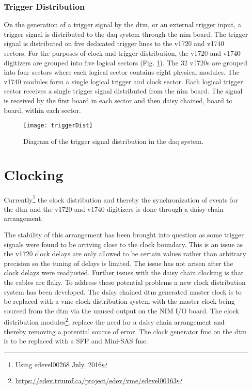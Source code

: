 \subsubsection{Trigger Distribution}
On the generation of a trigger signal by the \gls{dtm}, or an external trigger input, a trigger signal is distributed to the \gls{daq} system through the \gls{nim} board. 
The trigger signal is distributed on five dedicated trigger lines to the \gls{v1720} and \gls{v1740} sectors.
For the purposes of clock and trigger distribution, the \gls{v1720} and \gls{v1740} digitizers are grouped into five logical sectors (Fig. \ref{Fig:triggerDist}). 
The 32 \gls{v1720}s are grouped into four sectors where each logical sector contains eight physical modules. 
The \gls{v1740} modules form a single logical trigger and clock sector. 
Each logical trigger sector receives a single trigger signal distributed from the \gls{nim} board. 
The signal is received by the first board in each sector and then daisy chained, board to board, within each sector.


\begin{figure}
\centering
\texttt{[image: triggerDist]}
\caption{Diagram of the trigger signal distribution in the \gls{daq} system.}
\label{Fig:triggerDist}
\end{figure}


\section{Clocking} 
\label{sec:newClock}

Currently\footnote{Using edevel00268 July, 2016} the clock distribution and thereby the synchronization of events for the \gls{dtm} and the \gls{v1720} and \gls{v1740} digitizers is done through a daisy chain arrangement.

The stability of this arrangement has been brought into question as some trigger signals were found to be arriving close to the clock boundary. This is an issue as the \gls{v1720} clock delays are only allowed to be certain values rather than arbitrary precision so the tuning of delays is limited. The issue has not arisen after the clock delays were readjusted. Further issues with the daisy chain clocking is that the cables are flaky. 
To address these potential problems a new clock distribution system has been developed. 
The daisy chained \gls{dtm} generated master clock is to be replaced with a \gls{vme} clock distribution system with the master clock being sourced from the \gls{dtm} via the unused output on the NIM I/O board. The clock distribution modules\footnote{\url{https://edev.triumf.ca/project/edev/vme/edevel00163}}, replace the need for a daisy chain arrangement and thereby removing a potential source of error. The clock generator \gls{fmc} on the \gls{dtm} is to be replaced with a SFP and Mini-SAS \gls{fmc}.

